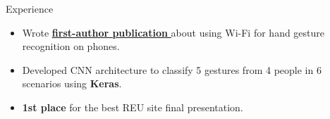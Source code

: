 \documentclass{resume} %
\begin{document}
\begin{workSection}{Experience}
    \experienceItem[
    company=Temple University,
    location=Philadelphia{,} PA,
    position=Undergraduate Research Intern,
    duration=June 2023 {-} July 2023
    ]
    \begin{itemize}
        \vspace{-0.5em}
        \itemsep -6pt {}
        \item Wrote
        \href{https://dl.acm.org/doi/10.1145/3565287.3617613}{\underline{\textbf{first-author publication} \faExternalLink}} 
				about using Wi-Fi 
				for hand gesture recognition on phones.
        \item Developed CNN architecture to classify 5 gestures from 4 people in 6 scenarios using \textbf{Keras}. %
        \item \textbf{1st place} for the best REU site final presentation. %
    \end{itemize}

\end{workSection}
\end{document}
